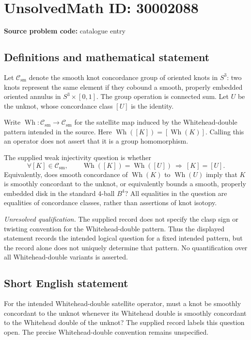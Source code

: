 \documentclass[11pt]{article}
\begin{document}
\section*{UnsolvedMath ID: 30002088}
\textbf{Source problem code:} catalogue entry
\subsection{Definitions and mathematical statement}
Let \(\mathcal{C}_{\mathrm{sm}}\) denote the smooth knot concordance group of oriented knots in \(S^3\): two knots represent the same element if they cobound a smooth, properly embedded oriented annulus in \(S^3\times[0,1]\). The group operation is connected sum. Let \(U\) be the unknot, whose concordance class \([U]\) is the identity.

Write \(\operatorname{Wh}\colon\mathcal{C}_{\mathrm{sm}}\to\mathcal{C}_{\mathrm{sm}}\) for the satellite map induced by the Whitehead-double pattern intended in the source. Here \(\operatorname{Wh}([K])=[\operatorname{Wh}(K)]\). Calling this an operator does not assert that it is a group homomorphism.

The supplied weak injectivity question is whether
\[
\forall [K]\in\mathcal{C}_{\mathrm{sm}},\qquad
\operatorname{Wh}([K])=\operatorname{Wh}([U])
\ \Longrightarrow\ [K]=[U].
\]
Equivalently, does smooth concordance of \(\operatorname{Wh}(K)\) to \(\operatorname{Wh}(U)\) imply that \(K\) is smoothly concordant to the unknot, or equivalently bounds a smooth, properly embedded disk in the standard \(4\)-ball \(B^4\)? All equalities in the question are equalities of concordance classes, rather than assertions of knot isotopy.

\emph{Unresolved qualification.} The supplied record does not specify the clasp sign or twisting convention for the Whitehead-double pattern. Thus the displayed statement records the intended logical question for a fixed intended pattern, but the record alone does not uniquely determine that pattern. No quantification over all Whitehead-double variants is asserted.
\subsection{Short English statement}
For the intended Whitehead-double satellite operator, must a knot be smoothly concordant to the unknot whenever its Whitehead double is smoothly concordant to the Whitehead double of the unknot? The supplied record labels this question open. The precise Whitehead-double convention remains unspecified.
\end{document}

